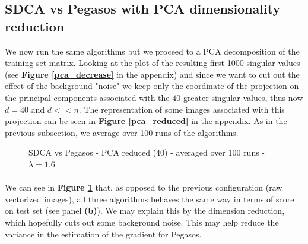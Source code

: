 \documentclass[10pt,a4paper]{article}
\begin{document}
\FloatBarrier
\subsection {SDCA vs Pegasos with PCA dimensionality reduction}

We now run the same algorithms but we proceed to a PCA decomposition of the training set matrix. Looking at the plot of the resulting first 1000 singular values (see \textbf{Figure \ref{pca_decrease}} in the appendix) and since we want to cut out the effect of the background "noise" we keep only the coordinate of the projection on the principal components associated with the $40$ greater singular values, thus now $d=40$ and $d << n$. The representation of some images associated with this projection can be seen in \textbf{Figure \ref{pca_reduced}} in the appendix. As in the previous subsection, we average over 100 runs of the algorithms.




\begin{figure}[!tbp]
  \centering
  \hfill
  \hfill
  \caption{SDCA vs Pegasos - PCA reduced (40) - averaged over 100 runs - $\lambda = 1.6$}\label{comparison_pca}
\end{figure}


\paragraph{}
We can see in \textbf{Figure \ref{comparison_pca}} that, as opposed to the previous configuration (raw vectorized images), all three algorithms behaves the same way in terms of score on test set (see panel \textbf{(b)}). We may explain this by the dimension reduction, which hopefully cuts out some background noise. This may help reduce the variance in the estimation of the gradient for Pegasos.
\end{document}
